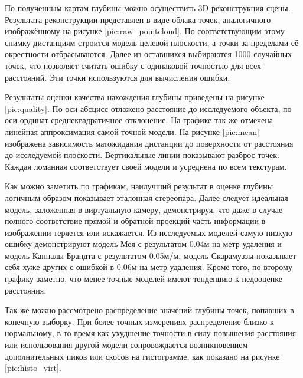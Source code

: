 
По полученным картам глубины можно осуществить 3D-реконструкция сцены. Результата реконструкции представлен  в виде облака точек, 
 аналогичного изображённому на рисунке \ref{pic:raw_pointcloud}. По соответствующим этому снимку дистанциям строится модель целевой плоскости, 
 а точки за пределами её окрестности отбрасываются. Далее из оставшихся выбираются 1000 случайных точек, что позволяет считать ошибку с 
 одинаковой точностью для всех расстояний.  %
Эти точки используются для вычисления ошибки. 


Результаты оценки качества нахождения глубины приведены на рисунке \ref{pic:quality}. По оси абсцисс отложено расстояние до исследуемого объекта,
по оси ординат среднеквадратичное отклонение. На графике так же отмечена линейная аппроксимация самой точной модели.
 На рисунке \ref{pic:mean} изображена зависимость матожидания дистанции до поверхности от расстояния
до исследуемой плоскости. Вертикальные линии показывают разброс точек.  Каждая ломанная соответствует своей модели и усреднена по всем текстурам.



Как можно заметить по графикам, наилучший результат в оценке глубины логичным образом показывает эталонная стереопара. Далее следует 
идеальная модель, заложенная в виртуальную камеру, демонстрируя, что даже в случае полного соответствие прямой и обратной проекций часть 
информации в изображении теряется или искажается. Из исследуемых моделей самую низкую ошибку демонстрируют модель Мея с результатом
0.04м на метр удаления и модель Канналы-Брандта с результатом 0.05м/м, модель Скарамуззы показывает себя хуже других с ошибкой в 0.06м на метр удаления.
 Кроме того, по второму графику заметно, что менее точные моделей имеют тенденцию к недооценке расстояния. 

Так же можно рассмотрено распределение значений глубины точек, попавших в конечную выборку. При более точных измерениях
распределение близко к нормальному, в то время как ухудшение точности в силу повышения расстояния или использования другой модели
сопровождается возникновением дополнительных пиков или скосов на гистограмме, как показано на рисунке \ref{pic:histo_virt}. 




